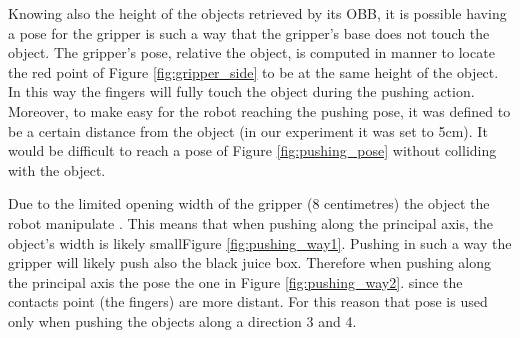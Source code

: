 Knowing also the height of the objects retrieved by its OBB, it is possible having a pose for the gripper is such a way that the gripper's base does not touch the object. The gripper's pose, relative  the object, is computed in manner to locate the red point of Figure \ref{fig:gripper_side} to be at the same height of the object. In this way the fingers will fully touch the object during the pushing action. Moreover, to make easy for the robot reaching the pushing pose, it was defined to be a certain distance from the object (in our experiment it was set to 5cm). It would be difficult to reach a pose of Figure \ref{fig:pushing_pose} without colliding with the object.  

Due to the limited opening width of the gripper (8 centimetres) the object the robot  manipulate . This means that when pushing along the principal axis, the object's width is likely smallFigure \ref{fig:pushing_way1}\DM{)}. Pushing in such a way the gripper will likely push also the black juice box. Therefore when pushing along the principal axis\DM{,} the pose  the one in Figure \ref{fig:pushing_way2}.  since the contacts point (the fingers) are more distant. For this reason that pose is used only when pushing the objects along a direction 3 and 4.


